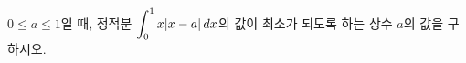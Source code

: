 $0\le a\le 1$일 때, 정적분 $\displaystyle\int_{0}^{1}x|x-a|\mkern3mu dx$의 값이 최소가 되도록 하는 상수 $a$의 값을 구하시오.
